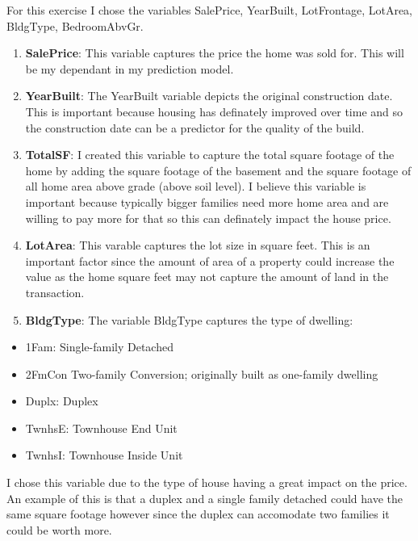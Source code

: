 \documentclass[
]{article}
\providecommand{\tightlist}{%
  \setlength{\itemsep}{0pt}\setlength{\parskip}{0pt}}
\begin{document}
\newpage

For this exercise I chose the variables SalePrice, YearBuilt,
LotFrontage, LotArea, BldgType, BedroomAbvGr.

\begin{enumerate}
\def\labelenumi{\arabic{enumi}.}
\item
  \textbf{SalePrice}: This variable captures the price the home was sold
  for. This will be my dependant in my prediction model.
\item
  \textbf{YearBuilt}: The YearBuilt variable depicts the original
  construction date. This is important because housing has definately
  improved over time and so the construction date can be a predictor for
  the quality of the build.
\item
  \textbf{TotalSF}: I created this variable to capture the total square
  footage of the home by adding the square footage of the basement and
  the square footage of all home area above grade (above soil level). I
  believe this variable is important because typically bigger families
  need more home area and are willing to pay more for that so this can
  definately impact the house price.
\item
  \textbf{LotArea}: This varable captures the lot size in square feet.
  This is an important factor since the amount of area of a property
  could increase the value as the home square feet may not capture the
  amount of land in the transaction.
\item
  \textbf{BldgType}: The variable BldgType captures the type of
  dwelling:
\end{enumerate}

\begin{itemize}
\tightlist
\item
  1Fam: Single-family Detached\\
\item
  2FmCon Two-family Conversion; originally built as one-family dwelling
\item
  Duplx: Duplex
\item
  TwnhsE: Townhouse End Unit
\item
  TwnhsI: Townhouse Inside Unit
\end{itemize}

I chose this variable due to the type of house having a great impact on
the price. An example of this is that a duplex and a single family
detached could have the same square footage however since the duplex can
accomodate two families it could be worth more.
\end{document}
